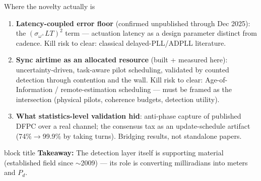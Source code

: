 \documentclass[aspectratio=169,10pt]{beamer}
\newcommand{\takeaway}[1]{%
  \vspace{2pt}\begin{beamercolorbox}[rounded=true,sep=4pt]{block title}%
  \small\textbf{Takeaway:} #1\end{beamercolorbox}}
\begin{document}
\begin{frame}{Where the novelty actually is}
  \small
  \begin{enumerate}
    \item \textbf{Latency-coupled error floor} (confirmed unpublished
      through Dec 2025): the $(\sigma_{\omega^+}LT)^2$ term ---
      actuation latency as a design parameter distinct from cadence.
      Kill risk to clear: classical delayed-PLL/ADPLL literature.
    \item \textbf{Sync airtime as an allocated resource} (built +
      measured here): uncertainty-driven, task-aware pilot
      scheduling, validated by counted detection through contention
      and the wall. Kill risk to clear: Age-of-Information /
      remote-estimation scheduling --- must be framed as the
      intersection (physical pilots, coherence budgets, detection
      utility).
    \item \textbf{What statistics-level validation hid}: anti-phase
      capture of published DFPC over a real channel; the consensus
      tax as an update-schedule artifact (74\%$\to$99.9\% by taking
      turns). Bridging results, not standalone papers.
  \end{enumerate}
  \takeaway{The detection layer itself is supporting material
  (established field since $\sim$2009) --- its role is converting
  milliradians into meters and $P_d$.}
\end{frame}
\end{document}
